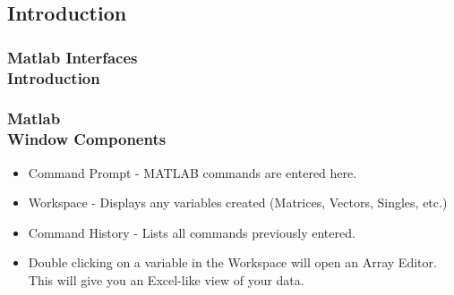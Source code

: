 \documentclass[hyperref={pdfpagelabels=true}]{beamer}
\begin{document}
\subsection{Introduction}

\begin{frame}
\frametitle{Matlab Interfaces \\ {\small Introduction}}
\end{frame}



\begin{frame}
\frametitle{Matlab \\ {\small Window Components}}
\begin{itemize}
\item[\ding{36}] Command Prompt - MATLAB commands are entered here.
\item[\ding{36}] Workspace - Displays any variables created (Matrices, Vectors, Singles, etc.)
\item[\ding{36}] Command History - Lists all commands previously entered.
\end{itemize}
\begin{itemize}
\item Double clicking on a variable in the Workspace will open an Array Editor. This will give you an Excel-like view of your data.
\end{itemize}
\end{frame}
\end{document}
